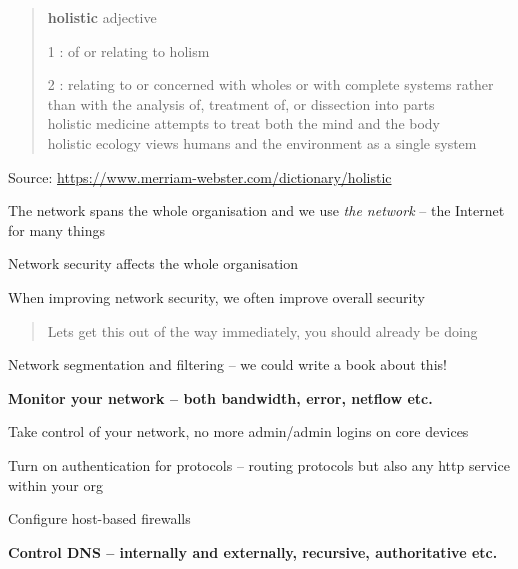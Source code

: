 \documentclass[Screen16to9,17pt]{foils}
\begin{document}
\begin{quote}
{\bf\Large holistic} adjective

\begin{list2}
\item[1]: of or relating to holism
\item[2] : relating to or concerned with wholes or with complete systems rather than with the analysis of, treatment of, or dissection into parts\\
holistic medicine attempts to treat both the mind and the body\\
holistic ecology views humans and the environment as a single system
\end{list2}
\end{quote}
Source: \url{https://www.merriam-webster.com/dictionary/holistic}

\begin{list2}
\item The network spans the whole organisation and we use \emph{the network} -- the Internet for many things
\item Network security affects the whole organisation
\item When improving network security, we often improve overall security
\end{list2}




\begin{quote}
Lets get this out of the way immediately, you should already be doing
\end{quote}

\begin{list2}
\item Network segmentation and filtering -- we could write a book about this! {\myalert}
\item {\bf Monitor your network -- both bandwidth, error, netflow etc.} {\myalert}
\item Take control of your network, no more admin/admin logins on core devices {\myalert}
\item Turn on authentication for protocols -- routing protocols but also any http service within your org {\myalert}
\item Configure host-based firewalls {\myalert}
\item  {\bf Control DNS -- internally and externally, recursive, authoritative etc.} {\myalert}
\end{list2}
\end{document}
